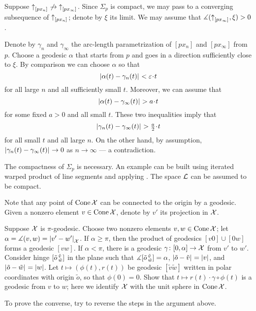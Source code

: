 Suppose ${\uparrow}_{[{p}{x_n}]_{{}}}\not\to{\uparrow}_{[{p}{x_\infty}]_{{}}}$.
Since $\Sigma_p$ is compact, we may pass to a converging subsequence of ${\uparrow}_{[{p}{x_n}]_{{}}}$;
denote by $\xi$ its limit.
We may assume that $\measuredangle ({\uparrow}_{[{p}{x_\infty}]_{{}}},\xi)>0$.

Denote by $\gamma_n$ and $\gamma_\infty$ the arc-length parametrization of $[px_n]$ and $[px_\infty]$ from $p$.
Choose a geodesic $\alpha$ that starts from $p$ and goes in a direction sufficiently close to $\xi$.
By comparison we can choose $\alpha$ so that
\[\dist{\alpha(t)}{\gamma_n(t)}{}<\eps\cdot t\]
for all large $n$ and all sufficiently small $t$.
Moreover, we can assume that
\[\dist{\alpha(t)}{\gamma_\infty(t)}{}>a\cdot t\]
for some fixed $a>0$ and all small $t$.
These two inequalities imply 
that 
\[\dist{\gamma_n(t)}{\gamma_\infty(t)}{}>\tfrac a2\cdot t\]
for all small $t$ and all large $n$.
On the other hand, by assumption, $|{\gamma_n(t)}-{\gamma_\infty(t)}|_{}^{{}}\to0$ as $n\to\infty$ --- a contradiction.

The compactness of $\Sigma_p$ is necessary.
An example can be built using iterated warped product of line segments and applying \cite[Theorem 1.2]{alexander-bishop2004}.
The space $\mathcal{L}$ can be assumed to be compact.


Note that any point of $\mathop{\rm Cone}\nolimits \mathcal{X}$ can be connected to the origin by a geodesic.
Given a nonzero element $v\in\mathop{\rm Cone}\nolimits \mathcal{X}$, denote by $v'$ its projection in $\mathcal{X}$.

Suppose $\mathcal{X}$ is $\pi$-geodesic.
Choose two nonzero elements $v,w\in\mathop{\rm Cone}\nolimits \mathcal{X}$; let $\alpha=\measuredangle(v,w)=|{v'}-{w'}|_{\mathcal{X}}^{{}}$.
If $\alpha\ge \pi$, then the product of geodesics $[v0]\cup [0w]$ forms a geodesic $[vw]$.
If $\alpha<\pi$, there is a geodesic $\gamma\colon[0,\alpha]\to \mathcal{X}$ from $v'$ to $w'$.
Consider hinge $[\tilde o\,{}^{\tilde v}_{\tilde w}]$ in the plane 
such that $\measuredangle[\tilde o\,{}^{\tilde v}_{\tilde w}]=\alpha$, $|{\tilde o}-{\tilde v}|_{}^{{}}=|v|$, and $|{\tilde o}-{\tilde w}|_{}^{{}}=|w|$.
Let $t\mapsto (\phi(t),r(t))$ be geodesic $[\tilde v\tilde w]$ written in polar coordinates with origin $\tilde o$, so that $\phi(0)=0$.
Show that $t\mapsto r(t)\cdot\gamma\circ\phi(t)$ is a geodesic from $v$ to $w$;
here we identify $\mathcal{X}$ with the unit sphere in $\mathop{\rm Cone}\nolimits \mathcal{X}$.

To prove the converse, try to reverse the steps in the argument above.


